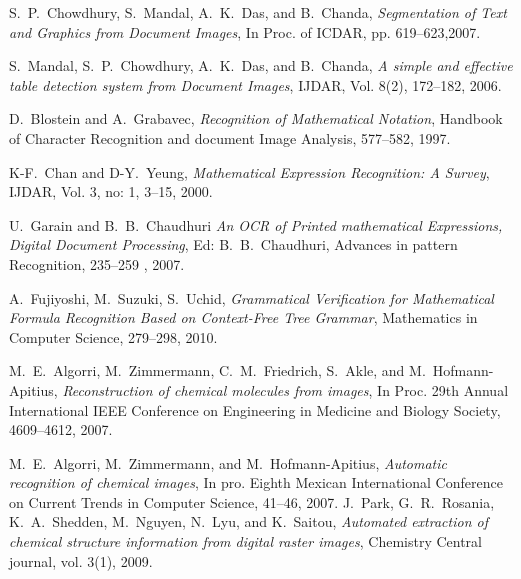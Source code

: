 \documentclass[conference]{IEEEtran}
\begin{document}
\begin{thebibliography}{1}


 S.~P.~Chowdhury, S.~Mandal, A.~K.~Das, and
B.~Chanda, \emph{Segmentation of Text and Graphics from Document
Images}, In Proc. of ICDAR, pp. 619–623,2007.

 S.~Mandal, S.~P.~Chowdhury, A.~K.~Das, and
B.~Chanda, \emph{A simple and effective table detection system
from Document Images}, IJDAR, Vol. 8(2), 172–182, 2006.

 D.~Blostein and A.~Grabavec,
\emph{Recognition of Mathematical Notation}, Handbook of
Character Recognition and document Image Analysis, 577--582,
1997.
 
 K-F.~Chan and D-Y.~Yeung, \emph{Mathematical
Expression Recognition: A Survey}, IJDAR, Vol. 3, no: 1, 3–15,
2000.

 U.~Garain and B.~B.~Chaudhuri \emph{An OCR
of Printed mathematical Expressions, Digital Document
Processing}, Ed: B.~B.~Chaudhuri, Advances in pattern
Recognition, 235–259 , 2007.

A.~Fujiyoshi, M.~Suzuki, S.~Uchid,
 \emph{Grammatical Verification for Mathematical Formula Recognition Based on Context-Free Tree Grammar},
 Mathematics in Computer Science, 279--298, 2010.
 
 
 M.~E.~Algorri, M.~Zimmermann, C.~M.~Friedrich, S.~Akle, and M.~Hofmann-Apitius,
\emph{Reconstruction of chemical molecules from images},
In Proc. 29th Annual International IEEE Conference on Engineering in
Medicine and Biology Society, 4609--4612, 2007.

M.~E.~Algorri, M.~Zimmermann, and M.~Hofmann-Apitius,
\emph{Automatic recognition of chemical images},
In pro. Eighth Mexican International Conference on Current Trends in Computer Science, 41--46, 2007.
J.~Park, G.~R.~Rosania, K.~A.~Shedden, M.~Nguyen, N.~Lyu, and K.~Saitou,
\emph{Automated extraction of chemical structure information from digital raster images}, Chemistry Central journal, vol. 3(1), 2009.

\end{thebibliography}




\end{document}
